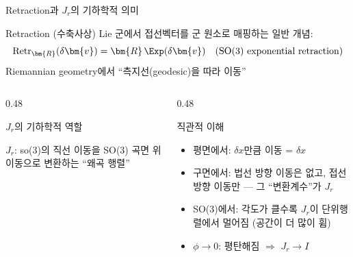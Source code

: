 \begin{frame}[shrink=5]{Retraction과 $J_r$의 기하학적 의미}
  \begin{block}{Retraction (수축사상)}
    Lie 군에서 접선벡터를 군 원소로 매핑하는 일반 개념:
    \[
      \text{Retr}_{\bm{R}}(\delta\bm{v}) = \bm{R}\,\Exp(\delta\bm{v}) \quad (\text{SO(3) exponential retraction})
    \]
    Riemannian geometry에서 ``측지선(geodesic)을 따라 이동''
  \end{block}
  \pause
  \begin{columns}[T]
    \begin{column}{0.48\textwidth}
      \begin{block}{$J_r$의 기하학적 역할}
        \begin{center}
        \end{center}
        $J_r$: so(3)의 직선 이동을 SO(3) 곡면 위 이동으로 변환하는 ``왜곡 행렬''
      \end{block}
    \end{column}
    \begin{column}{0.48\textwidth}
      \begin{exampleblock}{직관적 이해}
        \begin{itemize}
          \item 평면에서: $\delta x$만큼 이동 = $\delta x$
          \item 구면에서: 법선 방향 이동은 없고, 접선 방향 이동만 --- 그 ``변환계수''가 $J_r$
          \item SO(3)에서: 각도가 클수록 $J_r$이 단위행렬에서 멀어짐 (공간이 더 많이 휨)
          \item $\phi \to 0$: 평탄해짐 $\Rightarrow$ $J_r \to I$
        \end{itemize}
      \end{exampleblock}
    \end{column}
  \end{columns}
\end{frame}


